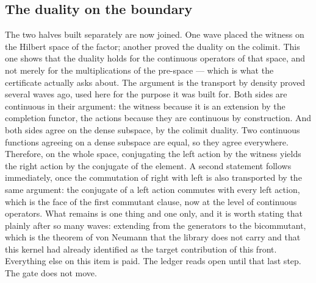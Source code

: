 \documentclass[11pt]{article}
\theoremstyle{definition}\newtheorem{deriv}{Derivation}
\begin{document}
\subsection*{The duality on the boundary}The two halves built separately are now joined. One wave placed the witness on the Hilbert space of the factor; another proved the duality on the colimit. This one shows that the duality holds for the continuous operators of that space, and not merely for the multiplications of the pre-space --- which is what the certificate actually asks about. The argument is the transport by density proved several waves ago, used here for the purpose it was built for. Both sides are continuous in their argument: the witness because it is an extension by the completion functor, the actions because they are continuous by construction. And both sides agree on the dense subspace, by the colimit duality. Two continuous functions agreeing on a dense subspace are equal, so they agree everywhere. Therefore, on the whole space, conjugating the left action by the witness yields the right action by the conjugate of the element. A second statement follows immediately, once the commutation of right with left is also transported by the same argument: the conjugate of a left action commutes with every left action, which is the face of the first commutant clause, now at the level of continuous operators. What remains is one thing and one only, and it is worth stating that plainly after so many waves: extending from the generators to the bicommutant, which is the theorem of von Neumann that the library does not carry and that this kernel had already identified as the target contribution of this front. Everything else on this item is paid. The ledger reads open until that last step. The gate does not move.
\end{document}
